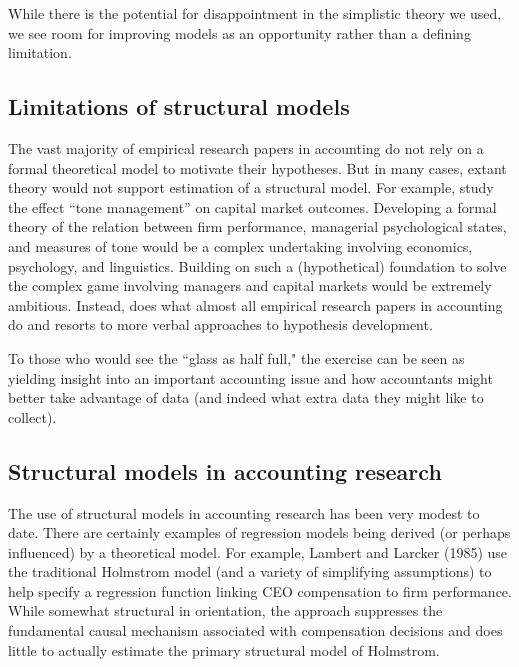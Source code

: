 While there is the potential for disappointment in the simplistic theory we used, we see room for improving models as an opportunity rather than a defining limitation.

\subsection{Limitations of structural models}
The vast majority of empirical research papers in accounting do not rely on a formal theoretical model to motivate their hypotheses.
But in many cases, extant theory would not support estimation of a structural model.
For example, \citet{Huang:2014cs} study the effect ``tone management'' on capital market outcomes.
Developing a formal theory of the relation between firm performance, managerial psychological states, and measures of tone would be a complex undertaking involving economics, psychology, and linguistics.
Building on such a (hypothetical) foundation to solve the complex game involving managers and capital markets would be extremely ambitious.
Instead, \citet{Huang:2014cs} does what almost all empirical research papers in accounting do and resorts to more verbal approaches to hypothesis development. 

To those who would see the ``glass as half full," the exercise can be seen as yielding insight into an important accounting issue and how accountants might better take advantage of data (and indeed what extra data they might like to collect).

\subsection{Structural models in accounting research}

The use of structural models in accounting research has been very modest to date.  There are certainly examples of regression models being derived (or perhaps influenced) by a theoretical model. For example, Lambert and Larcker (1985) use the traditional Holmstrom model (and a variety of simplifying assumptions) to help specify a regression function linking CEO compensation to firm performance. While somewhat structural in orientation, the approach suppresses the fundamental causal mechanism associated with compensation decisions and does little to actually estimate the primary structural model of Holmstrom.

